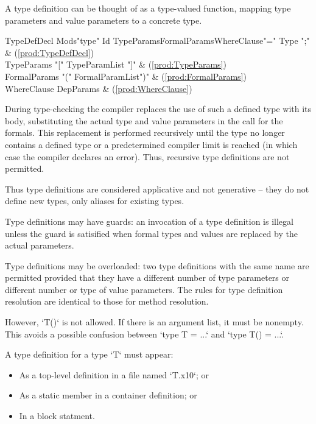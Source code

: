 A type definition can be thought of as a type-valued function,
mapping type parameters and value parameters to a concrete type.

\begin{bbgrammar}
         TypeDefDecl \: Mods\opt \xcd"type" Id TypeParams\opt FormalParams\opt WhereClause\opt \xcd"=" Type \xcd";" & (\ref{prod:TypeDefDecl}) \\
          TypeParams \: \xcd"[" TypeParamList \xcd"]" & (\ref{prod:TypeParams}) \\
        FormalParams \: \xcd"(" FormalParamList\opt \xcd")" & (\ref{prod:FormalParams}) \\
         WhereClause \: DepParams & (\ref{prod:WhereClause}) \\
\end{bbgrammar}

\noindent 
During type-checking the compiler replaces the use of such a defined
type with its body, substituting the actual type and value parameters
in the call for the formals. This replacement is performed recursively
until the type no longer contains a defined type or a predetermined
compiler limit is reached (in which case the compiler declares an
error). Thus, recursive type definitions are not permitted.

Thus type definitions are considered applicative and not generative --
they do not define new types, only aliases for existing types.

\label{TypeDefGuard}
Type definitions may have guards: an invocation of a type definition
is illegal unless the guard is satisified when formal types and values
are replaced by the actual parameters.

Type definitions may be overloaded: two type definitions with
the same name are permitted provided that they have a different number
of type parameters or different number or type of value parameters.  The rules
for type definition resolution are identical to those for method resolution.

However, \xcd`T()` is not allowed. If there is an argument list, it must be
nonempty.  This avoids a possible confusion between 
\xcd`type T = ...` and \xcd`type T() = ...`.  

A type definition for a type \xcd`T` must appear: 
\begin{itemize}
\item As a top-level definition in a file named \xcd`T.x10`; or
\item As a static member in a container definition; or
\item In a block statment.
\end{itemize}


